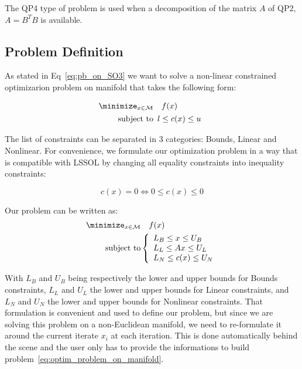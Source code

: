 The QP4 type of problem is used when a decomposition of the matrix $A$ of QP2, $A=B^T B$ is available.

\subsection{Problem Definition}
\label{sub:problem_definition}

As stated in Eq~\ref{eq:pb_on_SO3} we want to solve a non-linear constrained optimizarion problem on manifold that takes the following form:

\begin{align}
  \minimize_{x \in \mathcal{M}} & \quad f(x)\\
  \text{subject to}&
  \begin{array}{lr}
    l \leq c(x) \leq u \nonumber
  \end{array}
\end{align}

The list of constraints can be separated in 3 categories: Bounds, Linear and Nonlinear.
For convenience, we formulate our optimization problem in a way that is compatible with LSSOL by changing all equality constraints into inequality constraints:

\begin{equation}
  c(x) = 0 \Leftrightarrow 0 \leq c(x) \leq 0
\end{equation}

Our problem can be written as:
\begin{align}
\label{eq:optim_problem_on_manifold}
  \minimize_{x \in \mathcal{M}} & \quad f(x)\\ \nonumber
  \text{subject to}&\left\{
  \begin{array}{lr}
    L_B \leq x \leq U_B \\
    L_L \leq Ax \leq U_L \\
    L_N \leq c(x) \leq U_N
  \end{array}\right.
\end{align}

With $L_B$ and $U_B$ being respectively the lower and upper bounds for Bounds constraints, $L_L$ and $U_L$ the lower and upper bounds for Linear constraints, and $L_N$ and $U_N$ the lower and upper bounds for Nonlinear constraints.
That formulation is convenient and used to define our problem, but since we are solving this problem on a non-Euclidean manifold, we need to re-formulate it around the current iterate $x_i$ at each iteration.
This is done automatically behind the scene and the user only has to provide the informations to build problem~\ref{eq:optim_problem_on_manifold}.

